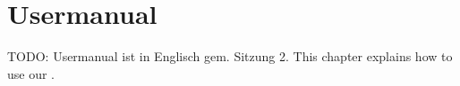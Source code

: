 \chapter{Usermanual}
\label{chap:Usermanual}
TODO: Usermanual ist in Englisch gem. Sitzung 2.
This chapter explains how to use our \titel{} \pg{}. 
